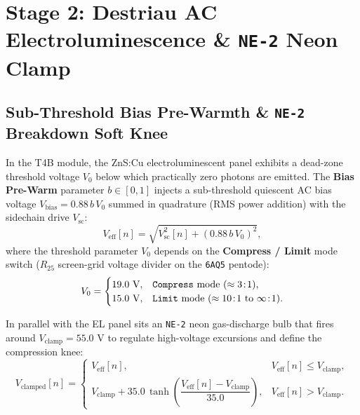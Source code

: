 \documentclass[11pt,a4paper]{article}
\begin{document}
\section{Stage 2: Destriau AC Electroluminescence \& \texttt{NE-2} Neon Clamp}

\subsection{Sub-Threshold Bias Pre-Warmth \& \texttt{NE-2} Breakdown Soft Knee}

In the T4B module, the ZnS:Cu electroluminescent panel exhibits a dead-zone threshold voltage $V_0$ below which practically zero photons are emitted. The \textbf{Bias Pre-Warm} parameter $b \in [0, 1]$ injects a sub-threshold quiescent AC bias voltage $V_{\text{bias}} = 0.88\,b\,V_0$ summed in quadrature (RMS power addition) with the sidechain drive $V_{\text{sc}}$:
\begin{equation}
    V_{\text{eff}}[n] = \sqrt{V_{\text{sc}}^2[n] + (0.88\,b\,V_0)^2},
\end{equation}
where the threshold parameter $V_0$ depends on the \textbf{Compress / Limit} mode switch ($R_{25}$ screen-grid voltage divider on the \texttt{6AQ5} pentode):
\begin{equation}
    V_0 = \begin{cases}
        19.0\text{ V}, & \text{\texttt{Compress} mode } (\approx 3\!:\!1), \\
        15.0\text{ V}, & \text{\texttt{Limit} mode } (\approx 10\!:\!1 \text{ to } \infty\!:\!1).
    \end{cases}
\end{equation}

In parallel with the EL panel sits an \texttt{NE-2} neon gas-discharge bulb that fires around $V_{\text{clamp}} = 55.0\text{ V}$ to regulate high-voltage excursions and define the compression knee:
\begin{equation}
    V_{\text{clamped}}[n] = \begin{cases}
        V_{\text{eff}}[n], & V_{\text{eff}}[n] \le V_{\text{clamp}}, \\[0.5em]
        V_{\text{clamp}} + 35.0\,\tanh\!\left(\dfrac{V_{\text{eff}}[n] - V_{\text{clamp}}}{35.0}\right), & V_{\text{eff}}[n] > V_{\text{clamp}}.
    \end{cases}
\end{equation}
\end{document}
